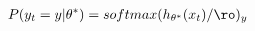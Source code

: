 \documentclass[preview]{standalone}
\begin{document}
\begin{align*}
P(y_t = y | \theta^*) = softmax(h_{\theta^*}(x_t)/\ro)_y
\end{align*}
\end{document}
